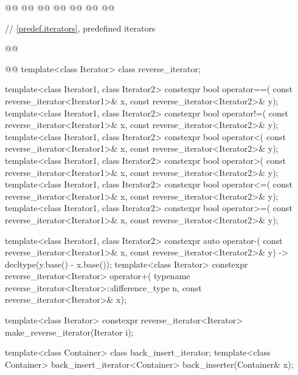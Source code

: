 \begin{addedblock}
\begin{codeblock}
{    @@
    @@
      @@
    @@
      @@
    @@
      @@
  }
\end{codeblock}\end{addedblock}\begin{codeblock}
  // \ref{predef.iterators}, predefined iterators 

  @@

  @@
  template<class Iterator> class reverse_iterator;

  template<class Iterator1, class Iterator2>
    constexpr bool operator==(
      const reverse_iterator<Iterator1>& x,
      const reverse_iterator<Iterator2>& y);
  template<class Iterator1, class Iterator2>
    constexpr bool operator!=(
      const reverse_iterator<Iterator1>& x,
      const reverse_iterator<Iterator2>& y);
  template<class Iterator1, class Iterator2>
    constexpr bool operator<(
      const reverse_iterator<Iterator1>& x,
      const reverse_iterator<Iterator2>& y);
  template<class Iterator1, class Iterator2>
    constexpr bool operator>(
      const reverse_iterator<Iterator1>& x,
      const reverse_iterator<Iterator2>& y);
  template<class Iterator1, class Iterator2>
    constexpr bool operator<=(
      const reverse_iterator<Iterator1>& x,
      const reverse_iterator<Iterator2>& y);
  template<class Iterator1, class Iterator2>
    constexpr bool operator>=(
      const reverse_iterator<Iterator1>& x,
      const reverse_iterator<Iterator2>& y);

  template<class Iterator1, class Iterator2>
    constexpr auto operator-(
      const reverse_iterator<Iterator1>& x,
      const reverse_iterator<Iterator2>& y) -> decltype(y.base() - x.base());
  template<class Iterator>
    constexpr reverse_iterator<Iterator>
      operator+(
    typename reverse_iterator<Iterator>::difference_type n,
    const reverse_iterator<Iterator>& x);

  template<class Iterator>
    constexpr reverse_iterator<Iterator> make_reverse_iterator(Iterator i);

  template<class Container> class back_insert_iterator;
  template<class Container>
    back_insert_iterator<Container> back_inserter(Container& x);


\end{codeblock}
